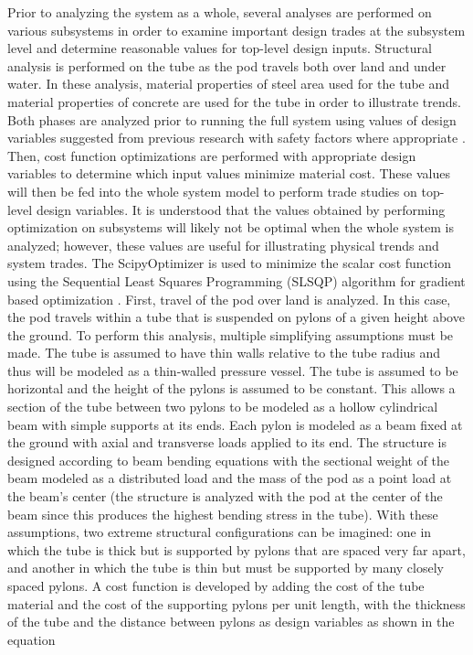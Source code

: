 Prior to analyzing the system as a whole, several analyses are performed on
various subsystems in order to examine important design trades at the subsystem
level and determine reasonable values for top-level design inputs.
Structural analysis is performed on the tube as the pod travels both over land and under water.
In these analysis, material properties of steel area used for the tube and
material properties of concrete are used for the tube in order to illustrate trends.
Both phases are analyzed prior to running the full system using values of
design variables suggested from previous research with safety factors where
appropriate \cite{Chin}. Then, cost function optimizations are performed with
appropriate design variables to determine which input values minimize material cost.
These values will then be fed into the whole system model to perform trade
studies on top-level design variables. It is understood that the values
obtained by performing optimization on subsystems will likely not be optimal
when the whole system is analyzed; however, these values are useful for
illustrating physical trends and system trades. The ScipyOptimizer is used to
minimize the scalar cost function using the Sequential Least Squares Programming
(SLSQP) algorithm for gradient based optimization \cite{GrayBenchmarking2013,Scipy}.
First, travel of the pod over land is analyzed. In this case, the pod travels
within a tube that is suspended on pylons of a given height above the ground.
To perform this analysis, multiple simplifying assumptions must be made. The
tube is assumed to have thin walls relative to the tube radius and thus will be
modeled as a thin-walled pressure vessel. The tube is assumed to be horizontal
and the height of the pylons is assumed to be constant. This allows a section
of the tube between two pylons to be modeled as a hollow cylindrical beam with
simple supports at its ends. Each pylon is modeled as a beam fixed at the
ground with axial and transverse loads applied to its end. The structure is
designed according to beam bending equations with the sectional weight of the
beam modeled as a distributed load and the mass of the pod as a point load at
the beam’s center (the structure is analyzed with the pod at the center of the
beam since this produces the highest bending stress in the tube).  With these
assumptions, two extreme structural configurations can be imagined: one in
which the tube is thick but is supported by pylons that are spaced very far apart,
and another in which the tube is thin but must be supported by many closely spaced pylons.
A cost function is developed by adding the cost of the tube material and the
cost of the supporting pylons per unit length, with the thickness of the tube
and the distance between pylons as design variables as shown in the equation

